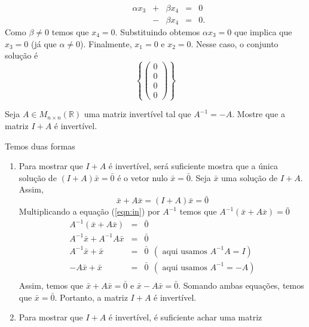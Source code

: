 \documentclass[11pt]{exam}
\begin{document}
\begin{questions}
\begin{solution}
\begin{enumerate}
$$\begin{matrix}
          & &   & &\alpha x_3    &+&\beta x_4&=&0\\
          & &   & &              &-&\beta x_4&=&0.
       \end{matrix}
       $$
       Como $\beta\neq0$ temos que $x_4=0$. Substituindo 
       obtemos $\alpha x_{3}=0$ que implica que $x_3=0$ (já que $\alpha \neq 0$).
       Finalmente, $x_1=0$ e $x_2=0$. Nesse caso, o conjunto solução é 
         $$ 
       \left\{
          \begin{pmatrix}
         0 \\
         0 \\
         0 \\
         0
         \end{pmatrix}
       \right\}
       $$ 
        \end{enumerate}
      \end{solution}
   \question[20]
   Seja $A \in M_{n\times n}(\mathbb{R})$ uma matriz invertível tal que $A^{-1}=-A$.
   Mostre que a matriz $I+A$ é invertível.
      \begin{solution}
      Temos duas formas 
      \begin{enumerate}
       \item Para mostrar que $I+A$ é invertível, será suficiente
       mostra que a única solução de $(I+A)\bar{x}=\bar{0}$ é o vetor nulo 
      $\bar{x}=\bar{0}$. 
      Seja $\bar{x}$ uma solução de $I+A$. Assim, 
        \begin{equation}
        \label{eqn:in}
        \bar{x}+A\bar{x}=(I+A)\bar{x}=\bar{0}
        \end{equation}   
        Multiplicando a equação (\ref{eqn:in}) por $A^{-1}$ temos que
      $A^{-1}(\bar{x}+A\bar{x})=\bar{0}$ 
        \begin{eqnarray*}
        A^{-1}(\bar{x}+A\bar{x})&=&\bar{0} \\
        A^{-1}\bar{x}+A^{-1}A \bar{x}&=&\bar{0}\\
        A^{-1}\bar{x}+ \bar{x}&=&\bar{0} \ \ (\text{ aqui usamos $A^{-1}A=I$})\\
        -A\bar{x}+ \bar{x}&=&\bar{0} \ \ (\text{ aqui usamos $A^{-1}=-A$})\\
        \end{eqnarray*}
       Assim, temos que    $\bar{x}+A\bar{x}=\bar{0}$
       e  $\bar{x}-A\bar{x}=\bar{0}$. Somando ambas equações, 
       temos que 
       $\bar{x}=\bar{0}$. Portanto, a matriz $I+A$ é invertível.
        \item Para mostrar que $I+A$ é invertível, é suficiente achar uma matriz

\end{enumerate}
\end{solution}
\end{questions}
\end{document}
